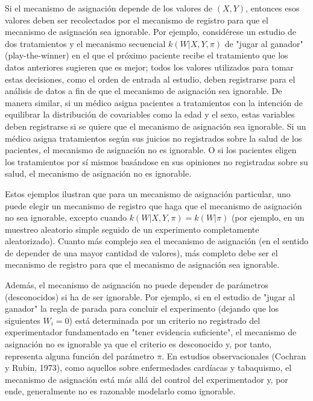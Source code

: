 \documentclass[12pt,a4paper]{article}
\begin{document}
Si el mecanismo de asignación depende de los valores de $(X, Y)$, entonces esos valores deben ser recolectados por el mecanismo de registro para que el mecanismo de asignación sea ignorable. Por ejemplo, considérese un estudio de dos tratamientos y el mecanismo secuencial $k(W|X,Y,\pi)$ de "jugar al ganador" (play-the-winner) en el que el próximo paciente recibe el tratamiento que los datos anteriores sugieren que es mejor; todos los valores utilizados para tomar estas decisiones, como el orden de entrada al estudio, deben registrarse para el análisis de datos a fin de que el mecanismo de asignación sea ignorable. De manera similar, si un médico asigna pacientes a tratamientos con la intención de equilibrar la distribución de covariables como la edad y el sexo, estas variables deben registrarse si se quiere que el mecanismo de asignación sea ignorable. Si un médico asigna tratamientos según sus juicios no registrados sobre la salud de los pacientes, el mecanismo de asignación no es ignorable. O si los pacientes eligen los tratamientos por sí mismos basándose en sus opiniones no registradas sobre su salud, el mecanismo de asignación no es ignorable.

Estos ejemplos ilustran que para un mecanismo de asignación particular, uno puede elegir un mecanismo de registro que haga que el mecanismo de asignación no sea ignorable, excepto cuando $k(W|X,Y,\pi)=k(W|\pi)$ (por ejemplo, en un muestreo aleatorio simple seguido de un experimento completamente aleatorizado). Cuanto más complejo sea el mecanismo de asignación (en el sentido de depender de una mayor cantidad de valores), más completo debe ser el mecanismo de registro para que el mecanismo de asignación sea ignorable.

Además, el mecanismo de asignación no puede depender de parámetros (desconocidos) si ha de ser ignorable. Por ejemplo, si en el estudio de "jugar al ganador" la regla de parada para concluir el experimento (dejando que los siguientes $W_i=0$) está determinada por un criterio no registrado del experimentador fundamentado en "tener evidencia suficiente", el mecanismo de asignación no es ignorable ya que el criterio es desconocido y, por tanto, representa alguna función del parámetro $\pi$. En estudios observacionales (Cochran y Rubin, 1973), como aquellos sobre enfermedades cardíacas y tabaquismo, el mecanismo de asignación está más allá del control del experimentador y, por ende, generalmente no es razonable modelarlo como ignorable.
\end{document}
